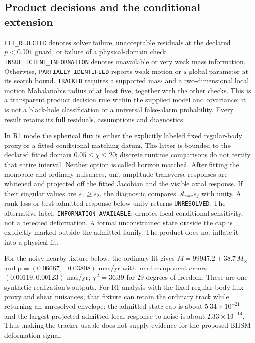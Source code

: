 \subsection{Product decisions and the conditional extension}
\texttt{FIT\_REJECTED} denotes solver failure, unacceptable residuals
at the declared $p<0.001$ guard, or failure of a physical-domain check.
\texttt{INSUFFICIENT\_INFORMATION} denotes unavailable or very weak mass
information. Otherwise, \texttt{PARTIALLY\_IDENTIFIED} reports weak
motion or a global parameter at its search bound.
\texttt{TRACKED} requires a supported mass and a two-dimensional local
motion Mahalanobis radius of at least five, together with the other
checks. This is a transparent product decision rule within the supplied
model and covariance; it is not a black-hole classification or a
universal false-alarm probability. Every result retains its full
residuals, assumptions and diagnostics.

In R1 mode the spherical flux is either the explicitly labeled fixed
regular-body proxy or a fitted conditional matching datum. The latter
is bounded to the declared fitted domain $0.05\le\chi\le20$; discrete
runtime comparisons do not certify that entire interval. Neither option is called
horizon matched. After fitting the monopole and ordinary nuisances,
unit-amplitude transverse responses are whitened and projected off the
fitted Jacobian and the visible axial response. If their singular
values are $s_1\ge s_2$, the diagnostic compares
$\mathcal A_{\max}s_j$ with unity. A rank loss or best admitted response
below unity returns \texttt{UNRESOLVED}. The alternative label,
\texttt{INFORMATION\_AVAILABLE}, denotes local conditional sensitivity,
not a detected deformation. A formal unconstrained state outside the
cap is explicitly marked outside the admitted family. The product does
not inflate it into a physical fit.

For the noisy nearby fixture below, the ordinary fit gives
$M=99947.2\pm38.7\,M_\odot$ and
$\boldsymbol\mu=(0.06667,-0.03808)$ mas/yr with local component errors
$(0.00119,0.00123)$ mas/yr; $\chi^2=36.39$ for 29 degrees of freedom.
These are one synthetic realization's outputs. For R1 analysis with the
fixed regular-body flux proxy and shear nuisances, that fixture can
retain the ordinary track while returning an unresolved envelope: the
admitted state cap is about $5.34\times10^{-21}$ and the largest
projected admitted local response-to-noise is about
$2.33\times10^{-14}$. Thus making the tracker usable does not supply
evidence for the proposed BHSM deformation signal.

